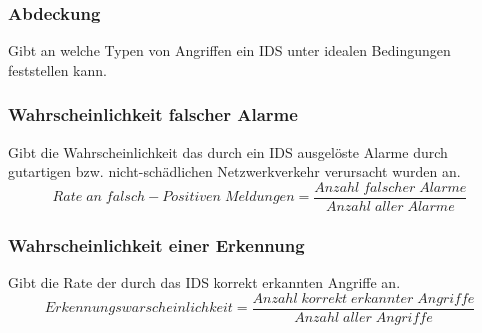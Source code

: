 \subsubsection{Abdeckung}
Gibt an welche Typen von Angriffen ein IDS unter idealen Bedingungen feststellen kann.
\subsubsection{Wahrscheinlichkeit falscher Alarme}
Gibt die Wahrscheinlichkeit das durch ein IDS ausgelöste Alarme durch gutartigen bzw. nicht-schädlichen Netzwerkverkehr verursacht wurden an.\\
\[Rate\;an\;falsch-Positiven\;Meldungen = \frac{Anzahl\;falscher\;Alarme}{Anzahl\;aller\;Alarme}\]
\subsubsection{Wahrscheinlichkeit einer Erkennung}
Gibt die Rate der durch das IDS korrekt erkannten Angriffe an.\\
\[Erkennungswarscheinlichkeit  = \frac{Anzahl\;korrekt\;erkannter\;Angriffe} {Anzahl\;aller\;Angriffe}\]
